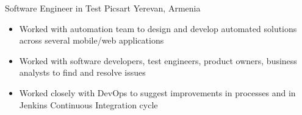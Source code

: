 \documentclass[10pt,a4paper,sans]{moderncv}        %
\newcommand{\picsart}{Picsart}
\newcommand{\yerevan}{Yerevan, Armenia}
\begin{document}

{Software Engineer in Test}
{\picsart}
{\yerevan}
{}
{
  \begin{itemize}
  \item Worked with automation team to design and develop automated
  solutions across several mobile/web applications
  \item Worked with software developers, test engineers,
  product owners, business analysts to find and resolve issues
  \item Worked closely with DevOps to suggest improvements in processes and in Jenkins Continuous Integration cycle
  \end{itemize}
} %
\end{document}
